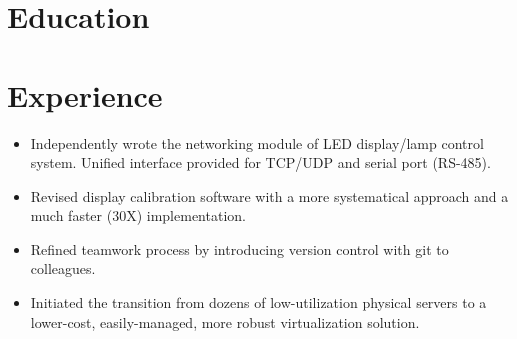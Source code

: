 \documentclass[10pt,a4paper]{moderncv/moderncv}
\begin{document}
\maketitle

\section{Education}


\section{Experience}
{
\begin{itemize}
	\item Independently wrote the networking module of LED display/lamp control system. Unified interface provided for TCP/UDP and serial port (RS-485).
	\item Revised display calibration software with a more systematical approach and a much faster (30X) implementation.
	\item Refined teamwork process by introducing version control with git to colleagues.
	\item Initiated the transition from dozens of low-utilization physical servers to a lower-cost, easily-managed, more robust virtualization solution. 
\end{itemize}
}
\end{document}
